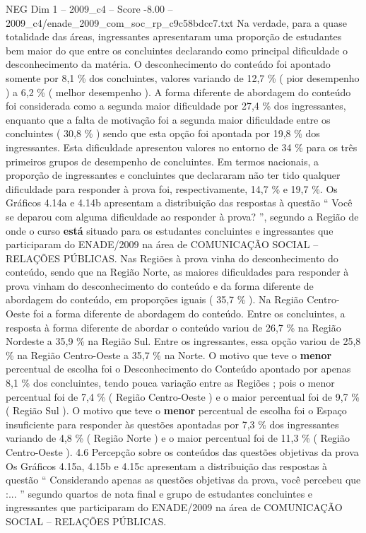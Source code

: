 \begin{textsample}{NEG Dim 1 – 2009\_c4 – Score -8.00 – 2009\_c4/enade\_2009\_com\_soc\_rp\_c9c58bdcc7.txt}
Na verdade, para a quase totalidade das áreas, ingressantes apresentaram uma proporção de estudantes bem maior do que entre os concluintes declarando como principal dificuldade o desconhecimento da matéria.
O desconhecimento do conteúdo foi apontado somente por 8,1 \% dos concluintes, valores variando de 12,7 \% ( pior desempenho ) a 6,2 \% ( melhor desempenho ).
A forma diferente de abordagem do conteúdo foi considerada como a segunda maior dificuldade por 27,4 \% dos ingressantes, enquanto que a falta de motivação foi a segunda maior dificuldade entre os concluintes ( 30,8 \% ) sendo que esta opção foi apontada por 19,8 \% dos ingressantes.
Esta dificuldade apresentou valores no entorno de 34 \% para os três primeiros grupos de desempenho de concluintes.
Em termos nacionais, a proporção de ingressantes e concluintes que declararam não ter tido qualquer dificuldade para responder à prova foi, respectivamente, 14,7 \% e 19,7 \%.
Os Gráficos 4.14a e 4.14b apresentam a distribuição das respostas à questão “ Você se deparou com alguma dificuldade ao responder à prova? ”, segundo a Região de onde o curso \textbf{está} situado para os estudantes concluintes e ingressantes que participaram do ENADE/2009 na área de COMUNICAÇÃO SOCIAL – RELAÇÕES PÚBLICAS.
Nas Regiões à prova vinha do desconhecimento do conteúdo, sendo que na Região Norte, as maiores dificuldades para responder à prova vinham do desconhecimento do conteúdo e da forma diferente de abordagem do conteúdo, em proporções iguais ( 35,7 \% ).
Na Região Centro-Oeste foi a forma diferente de abordagem do conteúdo.
Entre os concluintes, a resposta à forma diferente de abordar o conteúdo variou de 26,7 \% na Região Nordeste a 35,9 \% na Região Sul.
Entre os ingressantes, essa opção variou de 25,8 \% na Região Centro-Oeste a 35,7 \% na Norte.
O motivo que teve o \textbf{menor} percentual de escolha foi o Desconhecimento do Conteúdo apontado por apenas 8,1 \% dos concluintes, tendo pouca variação entre as Regiões ; pois o menor percentual foi de 7,4 \% ( Região Centro-Oeste ) e o maior percentual foi de 9,7 \% ( Região Sul ).
O motivo que teve o \textbf{menor} percentual de escolha foi o Espaço insuficiente para responder às questões apontadas por 7,3 \% dos ingressantes variando de 4,8 \% ( Região Norte ) e o maior percentual foi de 11,3 \% ( Região Centro-Oeste ). 4.6 Percepção sobre os conteúdos das questões objetivas da prova Os Gráficos 4.15a, 4.15b e 4.15c apresentam a distribuição das respostas à questão “ Considerando apenas as questões objetivas da prova, você percebeu que :... ” segundo quartos de nota final e grupo de estudantes concluintes e ingressantes que participaram do ENADE/2009 na área de COMUNICAÇÃO SOCIAL – RELAÇÕES PÚBLICAS.

\end{textsample}
